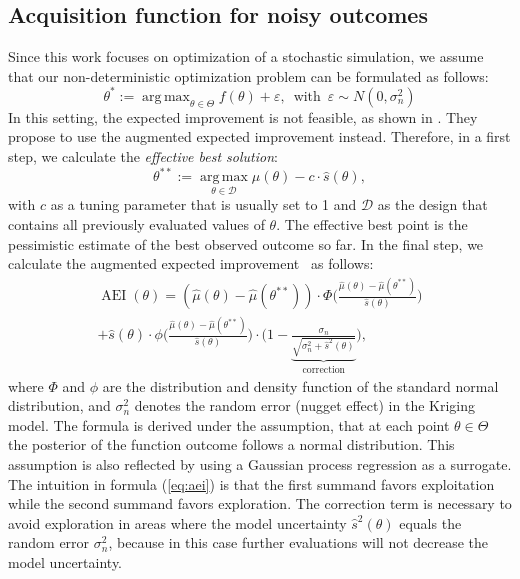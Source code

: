 \documentclass[bimj,fleqn]{w-art}
\theoremstyle{plain}
\theoremstyle{definition}
\begin{document}
\subsection{Acquisition function for noisy outcomes}
Since this work focuses on optimization of a stochastic simulation, we assume that our non-deterministic optimization problem can be formulated as follows:
\begin{equation}
\theta^\ast := \operatorname{arg\,max}_{\theta \in \Theta} f(\theta) + \varepsilon, \, \text{ with } \, \varepsilon \sim N(0, \sigma^2_{n}) %
\end{equation}
In this setting, the expected improvement is not feasible, as shown in \citet{huang_global_2006}.
They propose to use the augmented expected improvement instead.
Therefore, in a first step, we calculate the \emph{effective best solution}:
\begin{equation}
  \theta^{\ast\ast} := \operatorname{arg\,max}\limits_{\theta \in \mathcal{D}} \hat{\mu}(\theta) - c \cdot \hat{s}(\theta),
\end{equation}
with $c$ as a tuning parameter that is usually set to 1 and $\mathcal{D}$ as the design that contains all previously evaluated values of $\theta$.
The effective best point is the pessimistic estimate of the best observed outcome so far.
In the final step, we calculate the augmented expected improvement~\citep{huang_global_2006} as follows:
\begin{multline}
  \label{eq:aei}
  \operatorname{AEI}(\theta) = \left( \hat{\mu}(\theta) - \hat{\mu}(\theta^{\ast\ast}) \right) \cdot  \Phi \biggl( \frac{\hat{\mu}(\theta) - \hat{\mu}(\theta^{\ast\ast})}{\hat{s}(\theta)} \biggr) \\
   + \hat{s}(\theta) \cdot \phi \biggl( \frac{\hat{\mu}(\theta) - \hat{\mu}(\theta^{\ast\ast})}{\hat{s}(\theta)} \biggr) \cdot \biggl(1 - \underbrace{\frac{\sigma_{n}}{\sqrt{\sigma_{n}^2 + \hat{s}^2(\theta)}}}_{\text{correction}}\biggr),
\end{multline}
where $\Phi$ and $\phi$ are the distribution and density function of the standard normal distribution, and $\sigma_{n}^2$ denotes the random error (nugget effect) in the Kriging model.
The formula is derived under the assumption, that at each point $\theta \in \Theta$ the posterior of the function outcome follows a normal distribution.
This assumption is also reflected by using a Gaussian process regression as a surrogate.
The intuition in formula (\ref{eq:aei}) is that the first summand favors exploitation while the second summand favors exploration.
The correction term is necessary to avoid exploration in areas where the model uncertainty $\hat{s}^2(\theta)$ equals the random error $\sigma_{n}^2$, because in this case further evaluations will not decrease the model uncertainty.
\end{document}
